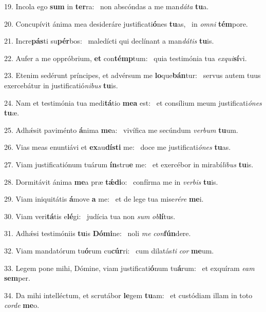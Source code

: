 19. Incola ego \textbf{sum} in \textbf{ter}ra: \ast\  non abscóndas a me man\textit{dá}\textit{ta} \textbf{tu}a.\

20. Concupívit ánima mea desideráre justificati\textbf{ó}nes \textbf{tu}as, \ast\  in \textit{om}\textit{ni} \textbf{tém}pore.\

21. Incre\textbf{pás}ti su\textbf{pér}bos: \ast\  maledícti qui declínant a man\textit{dá}\textit{tis} \textbf{tu}is.\

22. Aufer a me oppróbrium, \textbf{et} con\textbf{témp}tum: \ast\  quia testimónia tua \textit{ex}\textit{qui}\textbf{sí}vi.\

23. Etenim sedérunt príncipes, et advérsum me \textbf{lo}que\textbf{bán}tur: \ast\  servus autem tuus exercebátur in justificatió\textit{ni}\textit{bus} \textbf{tu}is.\

24. Nam et testimónia tua medi\textbf{tá}tio \textbf{me}\textbf{a} est: \ast\  et consílium meum justificati\textit{ó}\textit{nes} \textbf{tu}æ.\

25. Adhǽsit paviménto \textbf{á}nima \textbf{me}a: \ast\  vivífica me secúndum \textit{ver}\textit{bum} \textbf{tu}um.\

26. Vias meas enuntiávi et \textbf{ex}au\textbf{dís}\textbf{ti} me: \ast\  doce me justificati\textit{ó}\textit{nes} \textbf{tu}as.\

27. Viam justificatiónum tuárum \textbf{ín}stru\textbf{e} me: \ast\  et exercébor in mirabí\textit{li}\textit{bus} \textbf{tu}is.\

28. Dormitávit ánima \textbf{me}a præ \textbf{tǽ}\textbf{di}o: \ast\  confírma me in \textit{ver}\textit{bis} \textbf{tu}is.\

29. Viam iniquitátis \textbf{á}move \textbf{a} me: \ast\  et de lege tua mise\textit{ré}\textit{re} \textbf{me}i.\

30. Viam veri\textbf{tá}tis e\textbf{lé}gi: \ast\  judícia tua non \textit{sum} \textit{ob}\textbf{lí}tus.\

31. Adhǽsi testimóniis \textbf{tu}is \textbf{Dó}\textbf{mi}ne: \ast\  noli \textit{me} \textit{con}\textbf{fún}dere.\

32. Viam mandatórum tu\textbf{ó}rum cu\textbf{cúr}ri: \ast\  cum dilatás\textit{ti} \textit{cor} \textbf{me}um.\

33. Legem pone mihi, Dómine, viam justificati\textbf{ó}num tu\textbf{á}rum: \ast\  et exquíram \textit{e}\textit{am} \textbf{sem}per.\

34. Da mihi intelléctum, et scrutábor \textbf{le}gem \textbf{tu}am: \ast\  et custódiam illam in toto \textit{cor}\textit{de} \textbf{me}o.\

